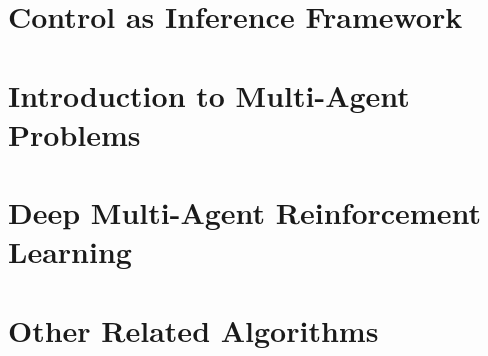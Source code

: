 \section{Control as Inference Framework}


\section{Introduction to Multi-Agent Problems}


\section{Deep Multi-Agent Reinforcement Learning}


\section{Other Related Algorithms}




